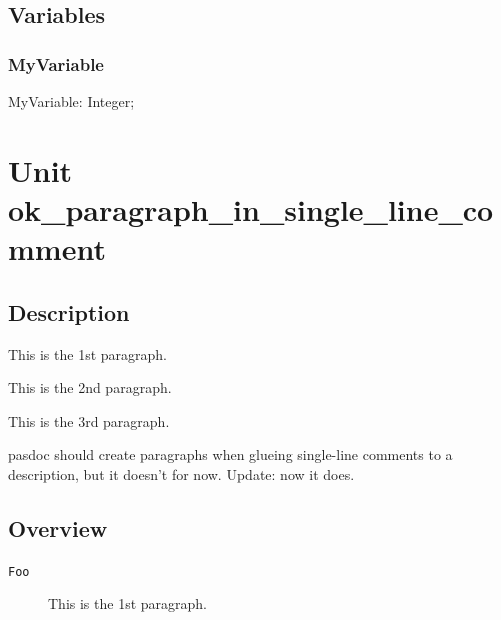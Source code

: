 \documentclass{report}
\newif\ifpdf
\begin{document}
\section{Variables}
\ifpdf
\subsection*{\large{\textbf{MyVariable}}\normalsize\hspace{1ex}\hrulefill}
\else
\subsection*{MyVariable}
\fi
\label{ok_nodescription_printing-MyVariable}
\begin{list}{}{
\setlength{\itemindent}{0cm}
\setlength{\listparindent}{0cm}
\setlength{\leftmargin}{\evensidemargin}
\addtolength{\leftmargin}{\tmplength}
\settowidth{\labelsep}{X}
\addtolength{\leftmargin}{\labelsep}
\setlength{\labelwidth}{\tmplength}
}
\item[\textbf{Declaration}\hfill]
\ifpdf
\begin{flushleft}
\fi
\begin{ttfamily}
MyVariable: Integer;\end{ttfamily}

\ifpdf
\end{flushleft}
\fi

\end{list}
\chapter{Unit ok{\_}paragraph{\_}in{\_}single{\_}line{\_}comment}
\label{ok_paragraph_in_single_line_comment}
\section{Description}
This is the 1st paragraph.

This is the 2nd paragraph.

This is the 3rd paragraph.

pasdoc should create paragraphs when glueing single{-}line comments to a description, but it doesn't for now. Update: now it does.
\section{Overview}
\begin{description}
\item[\texttt{Foo}]This is the 1st paragraph.
\end{description}
\end{document}

